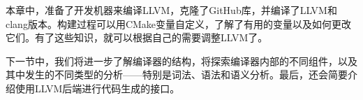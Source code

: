 本章中，准备了开发机器来编译LLVM，克隆了GitHub库，并编译了LLVM和clang版本。构建过程可以用CMake变量自定义，了解了有用的变量以及如何更改它们。有了这些知识，就可以根据自己的需要调整LLVM了。

下一节中，我们将进一步了解编译器的结构，将探索编译器内部的不同组件，以及其中发生的不同类型的分析——特别是词法、语法和语义分析。最后，还会简要介绍使用LLVM后端进行代码生成的接口。